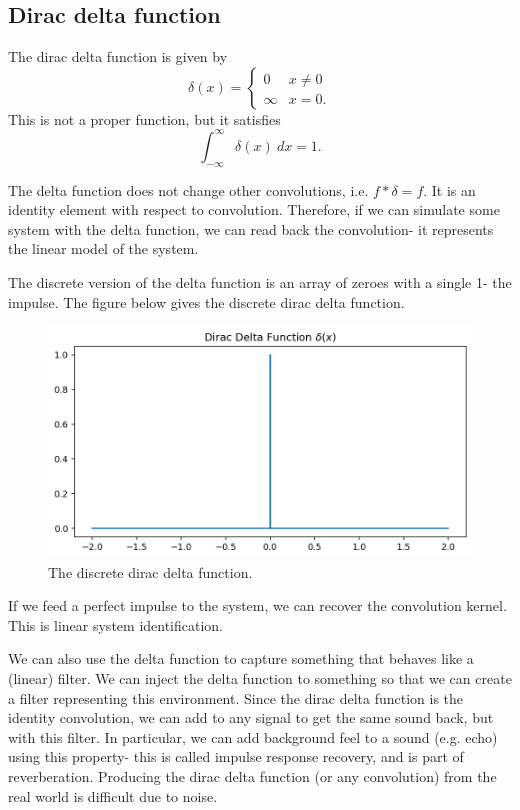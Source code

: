 \documentclass[a4paper, openany]{memoir}
\begin{document}
\subsection{Dirac delta function}
The dirac delta function is given by
\[\delta(x) = \begin{cases}
    0 & x \neq 0 \\
    \infty & x = 0.
\end{cases}\]
This is not a proper function, but it satisfies
\[\int_{-\infty}^{\infty} \delta(x) \ dx = 1.\]

The delta function does not change other convolutions, i.e. $f * \delta = f$. It is an identity element with respect to convolution. Therefore, if we can simulate some system with the delta function, we can read back the convolution- it represents the linear model of the system.

The discrete version of the delta function is an array of zeroes with a single 1- the impulse. The figure below gives the discrete dirac delta function.
\begin{figure}[H]
    \centering
    \includegraphics[scale=0.5]{src/6.20 dirac delta.png}
    \caption{The discrete dirac delta function.}
\end{figure}
\noindent If we feed a perfect impulse to the system, we can recover the convolution kernel. This is linear system identification.

We can also use the delta function to capture something that behaves like a (linear) filter. We can inject the delta function to something so that we can create a filter representing this environment. Since the dirac delta function is the identity convolution, we can add to any signal to get the same sound back, but with this filter. In particular, we can add background feel to a sound (e.g. echo) using this property- this is called impulse response recovery, and is part of reverberation. Producing the dirac delta function (or any convolution) from the real world is difficult due to noise.
\newpage
\end{document}
